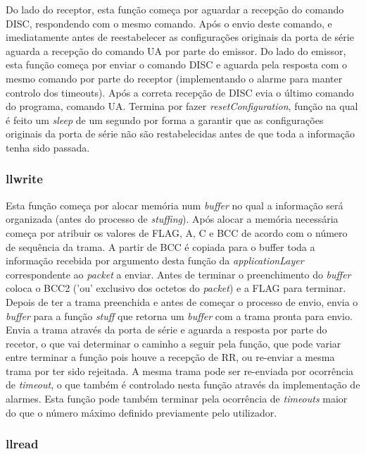 \documentclass[11pt]{article}
\begin{document}
    Do lado do receptor, esta função começa por aguardar a recepção do comando DISC, respondendo com o mesmo comando. Após o envio deste comando, e imediatamente antes de reestabelecer as configurações originais da porta de série aguarda a recepção do comando UA por parte do emissor.
	Do lado do emissor, esta função começa por enviar o comando DISC e aguarda pela resposta com o mesmo comando por parte do receptor (implementando o alarme para manter controlo dos timeouts). Após a correta recepção de DISC evia o último comando do programa, comando UA.
    Termina por fazer \textit{resetConfiguration}, função na qual é feito um \textit{sleep} de um segundo por forma a garantir que as configurações originais da porta de série não são restabelecidas antes de que toda a informação tenha sido passada.
   
 \subsubsection{llwrite}
    
	Esta função começa por alocar memória num \textit{buffer} no qual a informação será organizada (antes do processo de \textit{stuffing}). Após alocar a memória necessária começa por atribuir os valores de FLAG, A, C e BCC de acordo com o número de sequência da trama. A partir de BCC é copiada para o buffer toda a informação recebida por argumento desta função da \textit{applicationLayer} correspondente ao \textit{packet} a enviar. Antes de terminar o preenchimento do \textit{buffer} coloca o BCC2 ('ou' exclusivo dos octetos do \textit{packet}) e a FLAG para terminar.
	Depois de ter a trama preenchida e antes de começar o processo de envio, envia o \textit{buffer} para a função \textit{stuff} que retorna um \textit{buffer} com a trama pronta para envio.
	Envia a trama através da porta de série e aguarda a resposta por parte do recetor, o que vai determinar o caminho a seguir pela função, que pode variar entre terminar a função pois houve a recepção de RR, ou re-enviar a mesma trama por ter sido rejeitada.
	A mesma trama pode ser re-enviada por ocorrência de \textit{timeout}, o que também é controlado nesta função através da implementação de alarmes.
	Esta função pode também terminar pela ocorrência de \textit{timeouts} maior do que o número máximo definido previamente pelo utilizador.
	
 \subsubsection{llread}
   
\end{document}
